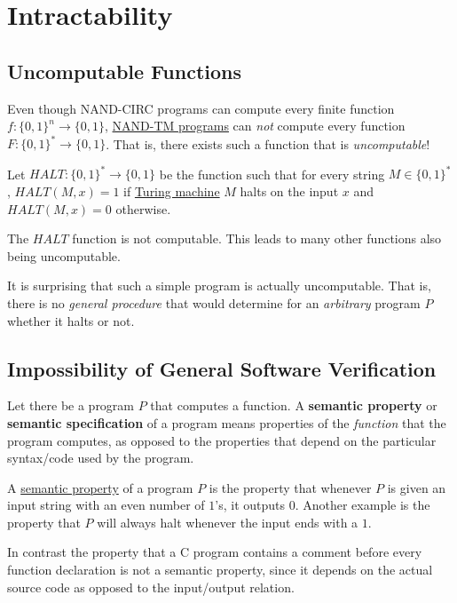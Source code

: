 \section{Intractability}

\subsection{Uncomputable Functions}

  Even though NAND-CIRC programs can compute every finite function $f: \{0,1\}^n \to \{0,1\}$, \hyperref[def:nand-tm-programs]{NAND-TM programs} can \textit{not} compute every function $F: \{0,1\}^* \to \{0,1\}$. That is, there exists such a function that is \textit{uncomputable}! 

  \begin{definition}
    \label{def:the-halting-problem}
  Let $HALT: \{0,1\}^* \to \{0,1\}$ be the function such that for every string $M \in \{0,1\}^*$, $HALT(M, x) = 1$ if \hyperref[def:turing-machine]{Turing machine} $M$ halts on the input $x$ and $HALT(M, x) = 0$ otherwise. 
  \end{definition}

  \begin{theorem}
    \label{thm:halt-is-not-computable}
  The $HALT$ function is not computable. This leads to many other functions also being uncomputable. 
  \end{theorem}

  It is surprising that such a simple program is actually uncomputable. That is, there is no \textit{general procedure} that would determine for an \textit{arbitrary} program $P$ whether it halts or not. 

\subsection{Impossibility of General Software Verification}

  \begin{definition}
    \label{def:semantic-property}
  Let there be a program $P$ that computes a function. A \textbf{semantic property} or \textbf{semantic specification} of a program means properties of the \textit{function} that the program computes, as opposed to the properties that depend on the particular syntax/code used by the program. 
  \end{definition}

  \begin{example}
    \label{ex:a-semantic-property-of-a-program}
  A \hyperref[def:semantic-property]{semantic property} of a program $P$ is the property that whenever $P$ is given an input string with an even number of $1$'s, it outputs $0$. Another example is the property that $P$ will always halt whenever the input ends with a $1$. 

  In contrast the property that a C program contains a comment before every function declaration is not a semantic property, since it depends on the actual source code as opposed to the input/output relation. 
  \end{example}

